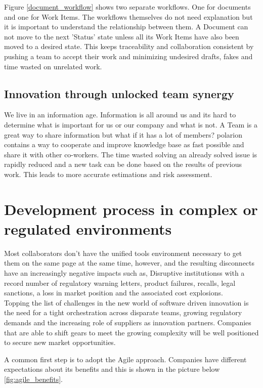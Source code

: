 \documentclass[thesis=M,english]{FITthesis}[2012/06/26]
\begin{document}
Figure \ref{document_workflow} shows two separate workflows. One for documents and one for Work Items. The workflows themselves do not need explanation but it is important to understand the relationship between them. A Document can not move to the next 'Status' state unless all its Work Items have also been moved to a desired state. This keeps traceability and collaboration consistent by pushing a team to accept their work and minimizing undesired drafts, fakes and time wasted on unrelated work. 

\subsection{Innovation through unlocked team synergy}

We live in an information age. Information is all around us and its hard to determine what is important for us or our company and what is not. A Team is a great way to share information but what if it has a lot of members? \acrshort{polarion} contains a way to cooperate and improve knowledge base as fast possible and share it with other co-workers. The time wasted solving an already solved issue is rapidly reduced and a new task can be done based on the results of previous work. This leads to more accurate estimations and risk assessment.

\section{Development process in complex or regulated environments}

Most collaborators don’t have the unified tools environment necessary to get them on the same page at the same time, however, and the resulting disconnects have an increasingly negative impacts such as, Disruptive institutionss with a record number of regulatory warning letters, product failures, recalls, legal sanctions, a loss in market position and the associated cost explosions.\\

Topping the list of challenges in the new world of software driven innovation is the need for a tight orchestration across disparate teams, growing regulatory demands and the increasing role of suppliers as innovation partners. Companies that are able to shift gears to meet the growing complexity will be well positioned to secure new market opportunities.

A common first step is to adopt the Agile approach. Companies have different expectations about its benefits and this is shown in the picture below \ref{fig:agile_benefits}.
\end{document}
